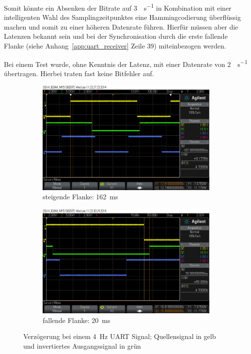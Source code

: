 \documentclass[12pt,a4paper]{article}
\begin{document}
Somit könnte ein Absenken der Bitrate auf \SI{3}{\bit\per\second} in Kombination mit einer intelligenten Wahl des Samplingzeitpunktes eine Hammingcodierung überflüssig machen und somit zu einer höheren Datenrate führen. Hierfür müssen aber die Latenzen bekannt sein und bei der Synchronisation durch die erste fallende Flanke (siehe Anhang~\ref{app:uart_receiver} Zeile 39) miteinbezogen werden.

Bei einem Test wurde, ohne Kenntnis der Latenz, mit einer Datenrate von \SI{2}{\bit\per\second} übertragen. Hierbei traten fast keine Bitfehler auf.

\begin{figure}[H]
  \centering
  \begin{subfigure}[b]{0.6\textwidth}
    \includegraphics[width=\textwidth]{../measurements/20140611/4Hz_rising_edge/scope_2.png}
    \caption{steigende Flanke: \SI{162}{\milli\second}}
    \label{fig:uart_4hz_rising_edge}
  \end{subfigure}
  \begin{subfigure}[b]{0.6\textwidth}
    \includegraphics[width=\textwidth]{../measurements/20140611/4Hz_falling_edge/scope_6.png}
    \caption{fallende Flanke: \SI{20}{\milli\second}}
    \label{fig:uart_4hz_falling_edge}
  \end{subfigure}
  \caption{Verzögerung bei einem \SI{4}{\hertz} UART Signal; Quellensignal in gelb und invertiertes Ausgangssignal in grün}
  \label{fig:uart_4hz_edge}
\end{figure}
\end{document}
